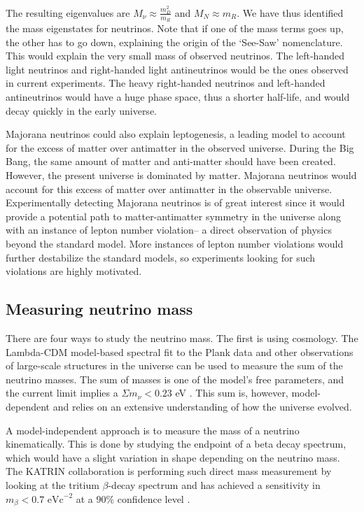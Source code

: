 The resulting eigenvalues are $M_\nu \approx \frac{m^2_D}{m_R}$ and $M_N \approx m_R$. We have thus identified the mass eigenstates for neutrinos. Note that if one of the mass terms goes up, the other has to go down, explaining the origin of the `See-Saw' nomenclature. This would explain the very small mass of observed neutrinos. The left-handed light neutrinos and right-handed light antineutrinos would be the ones observed in current experiments. The heavy right-handed neutrinos and left-handed antineutrinos would have a huge phase space, thus a shorter half-life, and would decay quickly in the early universe.

Majorana neutrinos could also explain leptogenesis, a leading model to account for the excess of matter over antimatter in the observed universe. During the Big Bang, the same amount of matter and anti-matter should have been created. However, the present universe is dominated by matter. Majorana neutrinos would account for this excess of matter over antimatter in the observable universe. Experimentally detecting Majorana neutrinos is of great interest since it would provide a potential path to matter-antimatter symmetry in the universe along with an instance of lepton number violation-- a direct observation of physics beyond the standard model. More instances of lepton number violations would further destabilize the standard models, so experiments looking for such violations are highly motivated.

\subsection{Measuring neutrino mass}

There are four ways to study the neutrino mass. The first is using cosmology. The Lambda-CDM model-based spectral fit to the Plank data and other observations of large-scale structures in the universe can be used to measure the sum of the neutrino masses. The sum of masses is one of the model's free parameters, and the current limit implies a $\Sigma m_\nu<0.23$ eV \cite{Planck_2015fie}. This sum is, however, model-dependent and relies on an extensive understanding of how the universe evolved. 

A model-independent approach is to measure the mass of a neutrino kinematically. This is done by studying the endpoint of a beta decay spectrum, which would have a slight variation in shape depending on the neutrino mass. The KATRIN collaboration is performing such direct mass measurement by looking at the tritium $\beta$-decay spectrum and has achieved a sensitivity in $m_\beta < 0.7 \text{ eVc}^{-2}$ at a $90\%$ confidence level \cite{KATRIN:2022}.

